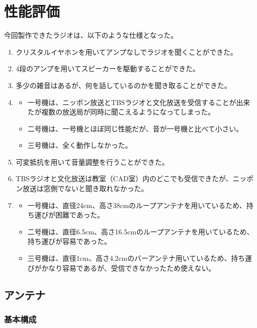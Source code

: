 \documentclass[report.tex]{subfiles}
\begin{document}
\section{性能評価}\label{sec:性能評価}

今回製作できたラジオは、以下のような仕様となった。

\begin{enumerate}
	\item クリスタルイヤホンを用いてアンプなしでラジオを聞くことができた。
	\item 4段のアンプを用いてスピーカーを駆動することができた。
	\item 多少の雑音はあるが、何を話しているのかを聞き取ることができた。
	\item \begin{itemize}
		      \item 一号機は、ニッポン放送とTBSラジオと文化放送を受信することが出来たが複数の放送局が同時に聞こえるようになってしまった。
		      \item 二号機は、一号機とほぼ同じ性能だが、音が一号機と比べて小さい。
		      \item 三号機は、全く動作しなかった。
	      \end{itemize}
	\item 可変抵抗を用いて音量調整を行うことができた。
	\item TBSラジオと文化放送は教室（CAD室）内のどこでも受信できたが、ニッポン放送は窓側でないと聞き取れなかった。
	\item \begin{itemize}
		      \item	一号機は、直径24cm、高さ38cmのループアンテナを用いているため、持ち運びが困難であった。
		      \item 二号機は、直径6.5cm、高さ16.5cmのループアンテナを用いているため、持ち運びが容易であった。
		      \item 三号機は、直径1cm、高さ4.2cmのバーアンテナ用いているため、持ち運びがかなり容易であるが、受信できなかったため使えない。
	      \end{itemize}
\end{enumerate}

\subsection{アンテナ}

\subsubsection{基本構成}
\end{document}
